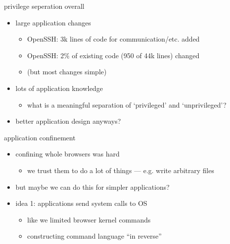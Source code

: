 \begin{frame}{privilege seperation overall}
    \begin{itemize}
    \item large application changes
        \begin{itemize}
        \item OpenSSH: 3k lines of code for communication/etc. added
        \item OpenSSH: 2\% of existing code (950 of 44k lines) changed
        \item (but most changes simple)
        \end{itemize}
    \item lots of application knowledge
        \begin{itemize}
        \item what is a meaningful separation of `privileged' and `unprivileged'?
        \end{itemize}
    \item better application design anyways?
    \end{itemize}
\end{frame}

\begin{frame}{application confinement}
    \begin{itemize}
    \item confining whole browsers was hard
        \begin{itemize}
            \item we trust them to do a lot of things --- e.g. write arbitrary files
        \end{itemize}
    \item but maybe we can do this for simpler applications?
    \item idea 1: applications send system calls to OS 
        \begin{itemize}
        \item {} like we limited browser kernel commands
        \item constructing command language ``in reverse''
        \end{itemize}
    \end{itemize}
\end{frame}


